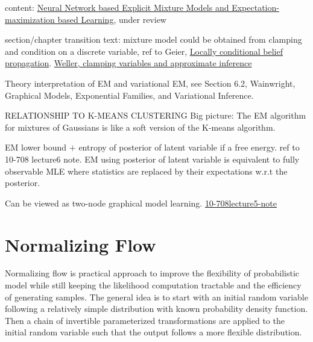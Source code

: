 content: \href{https://arxiv.org/abs/1907.13432}{Neural Network based Explicit Mixture Models and Expectation-maximization based Learning}, under review

section/chapter transition text: mixture model could be obtained from clamping and condition on a discrete variable, ref to Geier, \href{http://auai.org/uai2015/proceedings/papers/158.pdf}{Locally conditional belief propagation}. \href{https://papers.nips.cc/paper/5529-clamping-variables-and-approximate-inference.pdf}{Weller, clamping variables and approximate inference}

\begin{remark}
  Theory interpretation of EM and variational EM, see Section 6.2, Wainwright, Graphical Models, Exponential Families, and Variational Inference.
\end{remark}


\begin{remark}
  RELATIONSHIP TO K-MEANS CLUSTERING
  Big picture: The EM algorithm for mixtures of Gaussians is like a soft version of the K-means algorithm.
\end{remark}

\begin{remark}
  EM lower bound $+$ entropy of posterior of latent variable if a free energy. ref to 10-708 lecture6 note.
  EM using posterior of latent variable is equivalent to fully observable MLE where statistics are replaced by their expectations w.r.t the posterior.
\end{remark}

Can be viewed as two-node graphical model learning. \href{https://sailinglab.github.io/pgm-spring-2019/notes/lecture-05/}{10-708lecture5-note}
\section{Normalizing Flow}
Normalizing flow is practical approach to improve the flexibility of probabilistic model while still keeping the likelihood computation tractable and the efficiency of generating samples. The general idea is to start with an initial random variable following a relatively simple distribution with known probability density function. Then a chain of invertible parameterized transformations are applied to the initial random variable such that the output follows a more flexible distribution.

